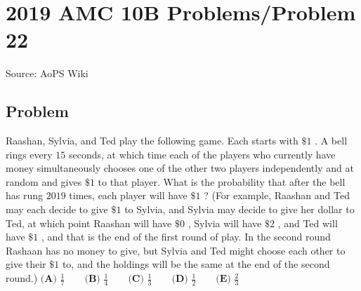 \documentclass[12pt]{article}
\begin{document}
\section*{{2019 AMC 10B Problems/Problem 22}}
Source: AoPS Wiki

\subsection*{Problem}
Raashan, Sylvia, and Ted play the following game. Each starts with $\$1$ . A bell rings every $15$ seconds, at which time each of the players who currently have money simultaneously chooses one of the other two players independently and at random and gives $\$1$ to that player. What is the probability that after the bell has rung $2019$ times, each player will have $\$1$ ? (For example, Raashan and Ted may each decide to give $\$1$ to Sylvia, and Sylvia may decide to give her dollar to Ted, at which point Raashan will have $\$0$ , Sylvia will have $\$2$ , and Ted will have $\$1$ , and that is the end of the first round of play. In the second round Rashaan has no money to give, but Sylvia and Ted might choose each other to give their $\$1$ to, and the holdings will be the same at the end of the second round.) $\textbf{(A) } \frac{1}{7} \qquad\textbf{(B) } \frac{1}{4} \qquad\textbf{(C) } \frac{1}{3} \qquad\textbf{(D) } \frac{1}{2} \qquad\textbf{(E) } \frac{2}{3}$
\end{document}
